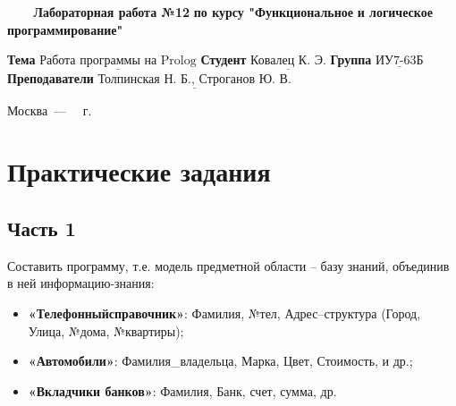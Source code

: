\documentclass[a4paper,14pt, unknownkeysallowed]{extreport}
\begin{document}
\begin{titlepage}
	
	\begin{center}
		\noindent\begin{minipage}{1.3\textwidth}\centering
		\Large\textbf{   ~~~ Лабораторная работа №12}\newline
		\textbf{по курсу "Функциональное}\newline
		\textbf{и логическое программирование"}\newline\newline\newline
		\end{minipage}
	\end{center}
	
	\noindent\textbf{Тема} 			$\underline{\text{Работа программы на Prolog}}$\newline\newline
	\noindent\textbf{Студент} 		$\underline{\text{Ковалец К. Э.}}$\newline\newline
	\noindent\textbf{Группа} 		$\underline{\text{ИУ7-63Б}}$\newline\newline
	\noindent\textbf{Преподаватели} $\underline{\text{Толпинская Н. Б., Строганов Ю. В.}}$\newline
	
	\begin{center}
		\vfill
		Москва~---~\the\year
		~г.
	\end{center}
	\restoregeometry
\end{titlepage}



\setcounter{page}{2}

\chapter{Практические задания}

\section{Часть 1}

Составить программу, т.е. модель предметной области -- базу знаний, объединив в ней информацию-знания:

\begin{itemize}
	\item \textbf{«Телефонныйсправочник»}: Фамилия, №тел, Адрес–структура (Город, Улица, №дома, №квартиры);
	\item \textbf{«Автомобили»}: Фамилия\_владельца, Марка, Цвет, Стоимость, и др.;
	\item \textbf{«Вкладчики банков»}: Фамилия, Банк, счет, сумма, др.
\end{itemize}
\end{document}
